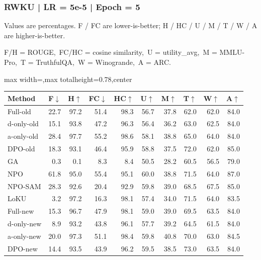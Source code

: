 \documentclass[aspectratio=169,11pt]{beamer}
\begin{document}
\begin{frame}[t]
\frametitle{RWKU | LR = 5e-5 | Epoch = 5}
{\tiny Values are percentages. F / FC are lower-is-better; H / HC / U / M / T / W / A are higher-is-better.}

{\tiny F/H = ROUGE,\ FC/HC = cosine similarity,\ U = utility\_avg,\ M = MMLU-Pro,\ T = TruthfulQA,\ W = Winogrande,\ A = ARC.}

\vspace{0.35em}
\centering
\scriptsize
\setlength{\tabcolsep}{3.6pt}
\renewcommand{\arraystretch}{1.05}
\begin{adjustbox}{max width=\textwidth,max totalheight=0.78\textheight,center}
\begin{tabular}{l*{9}{r}}
\toprule
Method & F$\downarrow$ & H$\uparrow$ & FC$\downarrow$ & HC$\uparrow$ & U$\uparrow$ & M$\uparrow$ & T$\uparrow$ & W$\uparrow$ & A$\uparrow$ \\
\midrule
\rowcolor{blue!10}
Full-old & 22.7 & 97.2 & 51.4 & 98.3 & 56.7 & 37.8 & 62.0 & 62.0 & 84.0 \\
\rowcolor{orange!10}
d-only-old & 15.1 & 93.8 & 47.2 & 96.3 & 56.4 & 36.2 & 63.0 & 62.5 & 84.0 \\
\rowcolor{green!10}
a-only-old & 28.4 & 97.7 & 55.2 & 98.6 & 58.1 & 38.8 & 65.0 & 64.0 & 84.0 \\
\rowcolor{gray!8}
DPO-old & 18.3 & 93.1 & 46.4 & 95.9 & 58.8 & 37.5 & 72.0 & 62.0 & 85.0 \\
\rowcolor{gray!8}
GA & 0.3 & 0.1 & 8.3 & 8.4 & 50.5 & 28.2 & 60.5 & 56.5 & 79.0 \\
\rowcolor{gray!8}
NPO & 61.8 & 95.0 & 55.4 & 95.1 & 60.0 & 38.8 & 71.5 & 64.0 & 87.0 \\
\rowcolor{gray!8}
NPO-SAM & 28.3 & 92.6 & 20.4 & 92.9 & 59.8 & 39.0 & 68.5 & 67.5 & 85.0 \\
\rowcolor{gray!8}
LoKU & 3.2 & 97.2 & 16.3 & 98.1 & 57.4 & 34.0 & 71.5 & 64.0 & 83.5 \\
\rowcolor{blue!20}
Full-new & 15.3 & 96.7 & 47.9 & 98.1 & 59.0 & 39.0 & 69.5 & 63.5 & 84.0 \\
\rowcolor{orange!20}
d-only-new & 8.9 & 93.2 & 43.8 & 96.1 & 57.7 & 39.2 & 64.5 & 61.5 & 84.0 \\
\rowcolor{green!20}
a-only-new & 20.0 & 97.3 & 51.1 & 98.4 & 59.8 & 40.8 & 70.0 & 63.0 & 84.5 \\
\rowcolor{gray!15}
DPO-new & 14.4 & 93.5 & 43.9 & 96.2 & 59.5 & 38.5 & 73.0 & 63.5 & 84.0 \\
\bottomrule
\end{tabular}
\end{adjustbox}
\end{frame}
\end{document}
